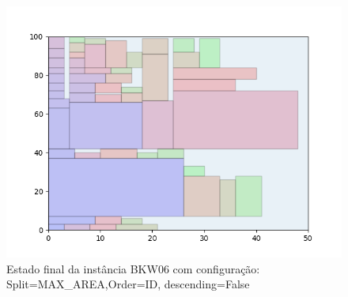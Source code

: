 \begin{figure}[H]
    \centering
    \caption[]{Estado final da instância BKW06 com configuração: Split=MAX_AREA,Order=ID, descending=False}
    \label{fig:bkw06-max_area-id-false}
    \includegraphics[scale=0.5]{output/figures/bkw/bkw06/max_area/id/false/00}
\end{figure}